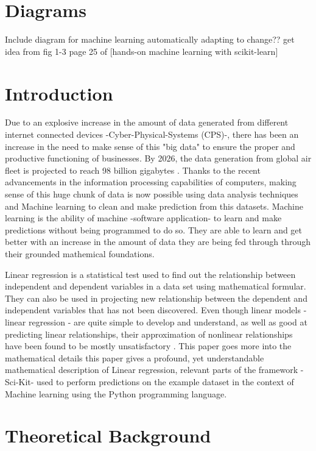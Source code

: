 \documentclass[conference]{IEEEtran}
\begin{document}
\section{Diagrams}
Include diagram for machine learning automatically adapting to change?? get idea from fig 1-3 page 25 of [hands-on machine learning with scikit-learn]
\section{Introduction}
Due to an explosive increase in the amount of data generated from different internet connected devices -Cyber-Physical-Systems (CPS)-, there has been an increase in the need to make sense of this "big data" to ensure the proper and productive functioning of businesses. By 2026, the data generation from global air fleet is projected to reach 98 billion gigabytes \cite{oliver_wyman}. Thanks to the recent advancements in the information processing capabilities of computers, making sense of this huge chunk of data is now possible using data analysis techniques and Machine learning to clean and make prediction from this datasets. Machine learning is the ability of machine -software application- to learn and make predictions without being programmed to do so. They are able to learn and get better with an increase in the amount of data they are being fed through through their grounded mathemical foundations.

\quad Linear regression is a statistical test used to find out the relationship between independent and dependent variables in a data set using mathematical formular. They can also be used in projecting new relationship between the dependent and independent variables that has not been discovered.
Even though linear models - linear regression - are quite simple to develop and understand, as well as good at predicting linear relationships, their approximation of nonlinear relationships have been found to be mostly unsatisfactory \cite{article_lee}. This paper goes more into the mathematical details 
this paper gives a profound, yet understandable mathematical description of Linear regression, relevant parts of the framework -Sci-Kit- used to perform predictions on the example dataset in the context of Machine learning using the Python programming language.

\section{Theoretical Background}
\end{document}
